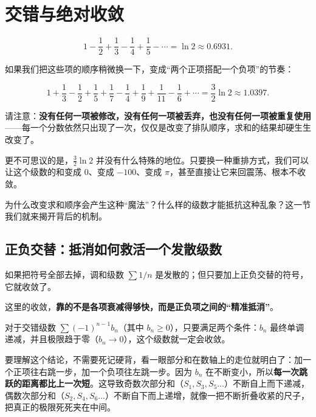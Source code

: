 \section{交错与绝对收敛}
\label{sec:02-Calculus/05-Sequences-and-Series/04}

\[
1-\frac12+\frac13-\frac14+\frac15-\cdots=\ln 2\approx0.6931.
\]

如果我们把这些项的顺序稍微换一下，变成“两个正项搭配一个负项”的节奏：

\[
1+\frac13-\frac12+\frac15+\frac17-\frac14+\frac19+\frac1{11}-\frac16+\cdots=\frac32\ln 2\approx1.0397.
\]

请注意：\textbf{没有任何一项被修改，没有任何一项被丢弃，也没有任何一项被重复使用}——每一个分数依然只出现了一次，仅仅是改变了排队顺序，求和的结果却硬生生改变了。

更不可思议的是，$\tfrac32\ln2$ 并没有什么特殊的地位。只要换一种重排方式，我们可以让这个级数的和变成 $0$、变成 $-100$、变成 $\pi$，甚至直接让它来回震荡、根本不收敛。

为什么改变求和顺序会产生这种“魔法”？什么样的级数才能抵抗这种乱象？这一节我们就来揭开背后的机制。

\subsection{正负交替：抵消如何救活一个发散级数}

如果把符号全部去掉，调和级数 $\sum 1/n$ 是发散的；但只要加上正负交替的符号，它就收敛了。

这里的收敛，\textbf{靠的不是各项衰减得够快，而是正负项之间的“精准抵消”}。

对于交错级数 $\sum(-1)^{n-1}b_n$（其中 $b_n\ge0$），只要满足两个条件：$b_n$ 最终单调递减，并且极限趋于零（$b_n \to 0$），这个级数就一定会收敛。

要理解这个结论，不需要死记硬背，看一眼部分和在数轴上的走位就明白了：加一个正项往右跳一步，加一个负项往左跳一步。因为 $b_n$ 在不断变小，所以\textbf{每一次跳跃的距离都比上一次短}。这导致奇数次部分和（$S_1, S_3, S_5\dots$）不断自上而下递减，偶数次部分和（$S_2, S_4, S_6\dots$）不断自下而上递增，就像一把不断折叠收紧的尺子，把真正的极限死死夹在中间。

